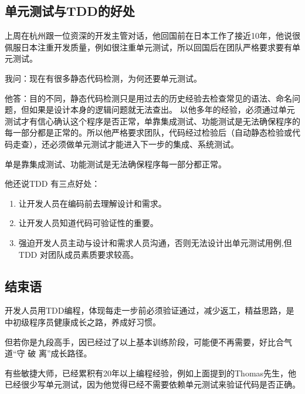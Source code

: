 \hypertarget{ux5355ux5143ux6d4bux8bd5ux4e0etddux7684ux597dux5904}{%
\subsection{单元测试与TDD的好处}\label{ux5355ux5143ux6d4bux8bd5ux4e0etddux7684ux597dux5904}}

上周在杭州跟一位资深的开发主管对话，他回国前在日本工作了接近10年，他说很佩服日本注重开发质量，例如很注重单元测试，所以回国后在团队严格要求要有单元测试。

我问：现在有很多静态代码检测，为何还要单元测试。

他答：目的不同，静态代码检测只是用过去的历史经验去检查常见的语法、命名问题，但如果是设计本身的逻辑问题就无法查出。
以他多年的经验，必须通过单元测试才有信心确认这个程序是否正常，单靠集成测试、功能测试是无法确保程序的每一部分都是正常的。所以他严格要求团队，代码经过检验后（自动静态检验或代码走查），还必须做单元测试才能进入下一步的集成、系统测试。

单是靠集成测试、功能测试是无法确保程序每一部分都正常。

他还说TDD 有三点好处：

\begin{enumerate}
\tightlist
\item
  让开发人员在编码前去理解设计和需求。
\item
  让开发人员知道代码可验证性的重要。
\item
  强迫开发人员主动与设计和需求人员沟通，否则无法设计出单元测试用例,但TDD
  对团队成员素质要求较高。
\end{enumerate}

\hypertarget{ux7ed3ux675fux8bed}{%
\subsection{结束语}\label{ux7ed3ux675fux8bed}}

开发人员用TDD编程，体现每走一步前必须验证通过，减少返工，精益思路，是中初级程序员健康成长之路，养成好习惯。

但若你是九段高手，因已经过了以上基本训练阶段，可能便不再需要，好比合气道``守
破 离''成长路径。

有些敏捷大师，已经累积有20年以上编程经验，例如上面提到的Thomas先生，他已经很少写单元测试，因为他觉得已经不需要依赖单元测试来验证代码是否正确。

\begin{description}
\item[]
\end{description}


